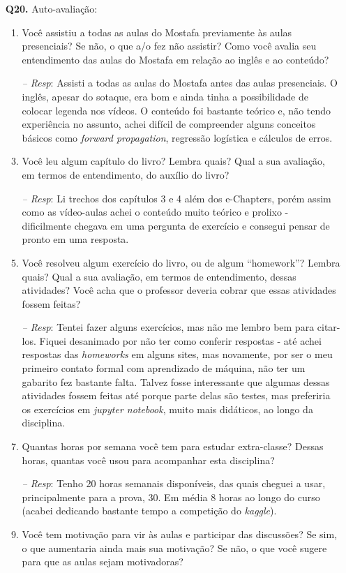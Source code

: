 \documentclass[12pt]{article}
\begin{document}
\begin{enumerate}
\item [\textbf{Q20.}] Auto-avaliação:
	\begin{enumerate}
		\item Você assistiu a todas as aulas do Mostafa previamente às aulas presenciais? 
		Se não, o que a/o fez não assistir? Como você avalia seu entendimento das aulas
		do Mostafa em relação ao inglês e ao conteúdo?
		\item[\textit{-- Resp}:] Assisti a todas as aulas do Mostafa antes das aulas presenciais. O inglês, apesar do sotaque, era bom e ainda tinha a possibilidade de colocar legenda nos vídeos. O conteúdo foi bastante teórico e, não tendo experiência no assunto, achei difícil de compreender alguns conceitos básicos como \textit{forward propagation}, regressão logística e cálculos de erros.		
		\item Você leu algum capítulo do livro? Lembra quais? Qual a sua avaliação, em
		termos de entendimento, do auxílio do livro?
		\item[\textit{-- Resp}:] Li trechos dos capítulos 3 e 4 além dos e-Chapters, porém assim como as vídeo-aulas achei o conteúdo muito teórico e prolixo - dificilmente chegava em uma pergunta de exercício e consegui pensar de pronto em uma resposta.		
		\item Você resolveu algum exercício do livro, ou de algum ``homework''? Lembra quais? 
		Qual a sua avaliação, em termos de entendimento, dessas atividades? Você acha que o professor 
		deveria cobrar que essas atividades fossem feitas?
		\item[\textit{-- Resp}:] Tentei fazer alguns exercícios, mas não me lembro bem para citar-los. Fiquei desanimado por não ter como conferir respostas - até achei respostas das \textit{homeworks} em alguns sites, mas novamente, por ser o meu primeiro contato formal com aprendizado de máquina, não ter um gabarito fez bastante falta. Talvez fosse interessante que algumas dessas atividades fossem feitas até porque parte delas são testes, mas preferiria os exercícios em \textit{jupyter notebook}, muito mais didáticos, ao longo da disciplina.		
		\item Quantas horas por semana você tem para estudar extra-classe? Dessas horas, quantas você usou para acompanhar esta disciplina?
		\item[\textit{-- Resp}:] Tenho 20 horas semanais disponíveis, das quais cheguei a usar, principalmente para a prova, 30. Em média 8 horas ao longo do curso (acabei dedicando bastante tempo a competição do \textit{kaggle}).
		\item Você tem motivação para vir às aulas e participar das discussões? Se sim, o que aumentaria ainda mais sua motivação? Se não, o que você sugere para que as aulas sejam motivadoras?

\end{enumerate}
\end{enumerate}
\end{document}
